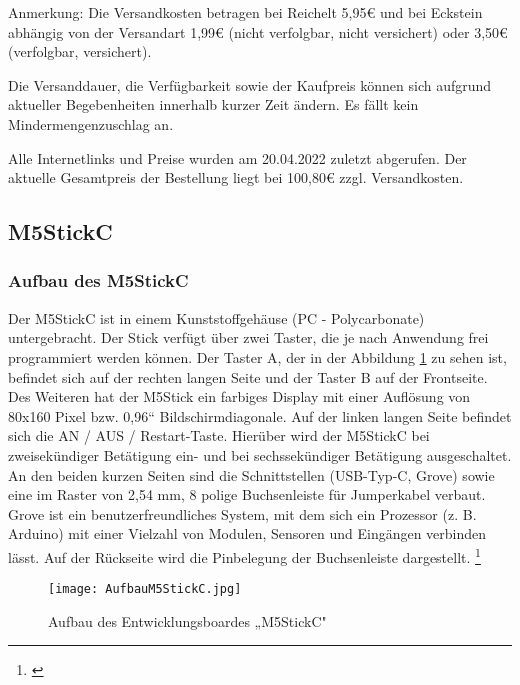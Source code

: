 Anmerkung: Die Versandkosten betragen bei Reichelt 5,95€ und bei Eckstein abhängig von der Versandart 1,99€ (nicht verfolgbar, nicht versichert) oder 3,50€ (verfolgbar, versichert).\par Die Versanddauer, die Verfügbarkeit sowie der Kaufpreis können sich aufgrund aktueller Begebenheiten innerhalb kurzer Zeit ändern. Es fällt kein Mindermengenzuschlag an.\par  
Alle Internetlinks und Preise wurden am 20.04.2022 zuletzt abgerufen. Der aktuelle Gesamtpreis der Bestellung liegt bei 100,80€ zzgl. Versandkosten.


\newpage

\subsection{M5StickC}
\subsubsection{Aufbau des M5StickC}
Der M5StickC ist in einem Kunststoffgehäuse (PC - Polycarbonate) untergebracht. Der Stick verfügt über zwei Taster, die je nach Anwendung frei programmiert werden können. Der Taster A, der in der Abbildung \ref{AufbauM5StickC} zu sehen ist, befindet sich auf der rechten langen Seite und der Taster B auf der Frontseite. Des Weiteren hat der M5Stick ein farbiges Display mit einer Auflösung von 80x160 Pixel bzw. 0,96“ Bildschirmdiagonale. Auf der linken langen Seite befindet sich die AN / AUS / Restart-Taste. Hierüber wird der M5StickC bei zweisekündiger Betätigung ein- und bei sechssekündiger Betätigung ausgeschaltet.  An den beiden kurzen Seiten sind die Schnittstellen (USB-Typ-C, Grove) sowie eine im Raster von 2,54 mm, 8 polige Buchsenleiste für Jumperkabel verbaut. Grove ist ein benutzerfreundliches System, mit dem sich ein Prozessor (z. B. Arduino) mit einer Vielzahl von Modulen, Sensoren und Eingängen verbinden lässt. Auf der Rückseite wird die Pinbelegung der Buchsenleiste dargestellt. \footnote{\cite{M5STACK.}}

\begin{figure}[H]	%
\begin{center}
\texttt{[image: AufbauM5StickC.jpg]}
\caption{Aufbau des Entwicklungsboardes „M5StickC" \protect\cite{M5STACK.}}
\label{AufbauM5StickC}
\end{center}
\end{figure}

\newpage



